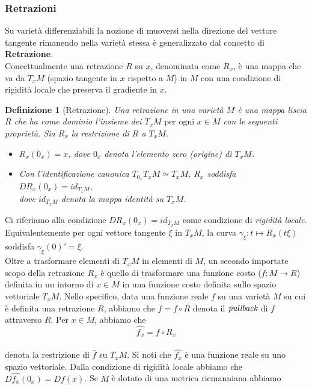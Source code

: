 \documentclass[a4paper, 12pt]{article}
\newtheorem{definition}{Definizione}
\begin{document}
\subsubsection{Retrazioni} \label{retraction}
Su varietà differenziabili la nozione di muoversi nella direzione del vettore tangente rimanendo nella varietà stessa è generalizzato dal concetto di \textbf{Retrazione}.\\
Concettualmente una retrazione $R$ su $x$, denominata come $R_x$, è una mappa che va da $T_xM$ (spazio tangente in $x$ rispetto a $M$) in $M$ con una condizione di rigidità locale che preserva il gradiente in $x$.
\begin{definition}[Retrazione]
Una retrazione in una varietà $M$ è una mappa liscia $R$ che ha come dominio l'insieme dei $T_xM \mbox{ per ogni } x \in M$ con le seguenti proprietà. Sia $R_x$ la restrizione di $R$ a $T_xM$.
\begin{itemize}
  \item $R_x(0_x) = x$, dove $0_x$ denota l'elemento zero (origine) di $T_xM$.
  \item Con l'identificazione canonica $T_{0_x} T_xM \simeq T_xM$, $R_x$ soddisfa\\
  $DR_x(0_x) = id_{T_xM},$\\
  dove $id_{T_xM}$ denota la mappa identità su $T_xM$.
\end{itemize}
\end{definition}
Ci riferiamo alla condizione $DR_x(0_x) = id_{T_xM}$ come condizione di \emph{rigidità locale}. Equivalentemente per ogni vettore tangente $\xi$ in $T_xM$, la curva $\gamma_{\xi}:t \mapsto R_x(t\xi)$ soddisfa $\gamma_{\xi}(0)' = \xi$.\\
Oltre a trasformare elementi di $T_xM$ in elementi di $M$, un secondo importate scopo della retrazione $R_x$ è quello di trasformare una funzione costo ($f:M \to R$) definita in un intorno di $x \in M$ in una funzione costo definita sullo spazio vettoriale $T_xM$. Nello specifico, data una funzione reale $f$ su una varietà $M$ su cui è definita una retrazione $R$, abbiamo che $\hat{f} = f \circ R$ denota il $\emph{pullback}$ di $f$ attraverso $R$. Per $x \in M$, abbiamo che\\
\[\hat{f_x} = f \circ R_x\]\\
denota la restrizione di $\hat{f}$ su $T_xM$. Si noti che $\hat{f_x}$ è una funzione reale su uno spazio vettoriale. Dalla condizione di rigidità locale abbiamo che $D\hat{f_x}(0_x) = Df(x)$. Se $M$ è dotato di una metrica riemanniana abbiamo\\
\end{document}
